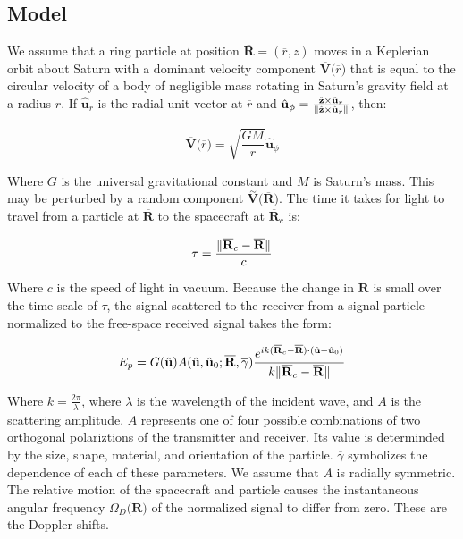 \documentclass[oneside]{book}
\theoremstyle{mystyle}
\DeclarePairedDelimiter\norm{\lVert}{\rVert}
\begin{document}
\subsection{Model}

We assume that a ring particle at position $\overline{\mathbf{R}} = (\overline{r},z)$ moves in a Keplerian orbit about Saturn with a dominant velocity component $\overline{\mathbf{V}}\big(\overline{r}\big)$ that is equal to the circular velocity of a body of negligible mass rotating in Saturn's gravity field at a radius $r$. If $\hat{\mathbf{u}}_{r}$ is the radial unit vector at $\overline{r}$ and $\hat{\mathbf{u}}_{\phi} = \frac{\hat{\mathbf{z}}\times \hat{\mathbf{u}}_{r}}{\norm{\hat{\mathbf{z}}\times \hat{\mathbf{u}}_{r}}}$, then:

\begin{equation}
\overline{\mathbf{V}}\big(\overline{r}\big) = \sqrt{\frac{GM}{r}}\hat{\mathbf{u}}_{\phi}
\end{equation}

Where $G$ is the universal gravitational constant and $M$ is Saturn's mass. This may be perturbed by a random component $\overset{\sim}{\mathbf{V}}\big(\overline{\mathbf{R}}\big)$. The time it takes for light to travel from a particle at $\overline{\mathbf{R}}$ to the spacecraft at $\overline{\mathbf{R}}_{c}$ is:

\begin{equation}
\tau = \frac{\norm{\overline{\mathbf{R}}_{c}-\overline{\mathbf{R}}}}{c}
\end{equation}

\noindent Where $c$ is the speed of light in vacuum. Because the change in $\overline{\mathbf{R}}$ is small over the time scale of $\tau$, the signal scattered to the receiver from a signal particle normalized to the free-space received signal takes the form:

\begin{equation}
E_{p} = G(\hat{\mathbf{u}})A(\hat{\mathbf{u}},\hat{\mathbf{u}}_{0};\overline{\mathbf{R}},\overline{\gamma})\frac{e^{ik(\overline{\mathbf{R}}_{c}-\overline{\mathbf{R}})\cdot (\hat{\mathbf{u}}-\hat{\mathbf{u}}_{0})}}{k\norm{\overline{\mathbf{R}}_{c}-\overline{\mathbf{R}}}}
\end{equation}

\noindent Where $k = \frac{2\pi}{\lambda}$, where $\lambda$ is the wavelength of the incident wave, and $A$ is the scattering amplitude. $A$ represents one of four possible combinations of two orthogonal polariztions of the transmitter and receiver. Its value is determinded by the size, shape, material, and orientation of the particle. $\overline{\gamma}$ symbolizes the dependence of each of these parameters. We assume that $A$ is radially symmetric. The relative motion of the spacecraft and particle causes the instantaneous angular frequency $\Omega_{D}\big(\overline{\mathbf{R}}\big)$ of the normalized signal to differ from zero. These are the Doppler shifts.
\end{document}

